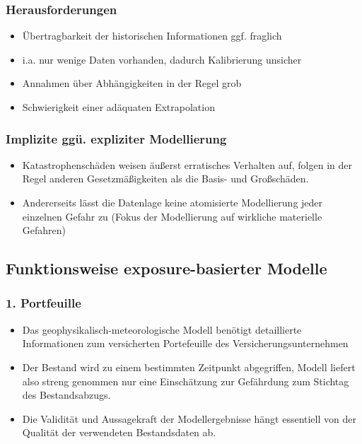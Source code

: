 \documentclass[12pt]{report}
\theoremstyle{dotless}
\theoremstyle{definition}
\begin{document}
\subsubsection{Herausforderungen} \begin{itemize}
\item Übertragbarkeit der historischen Informationen ggf. fraglich
\item i.a. nur wenige Daten vorhanden, dadurch Kalibrierung unsicher
\item Annahmen über Abhängigkeiten in der Regel grob
\item Schwierigkeit einer adäquaten Extrapolation
\end{itemize}

\subsubsection{Implizite ggü. expliziter Modellierung}
\begin{itemize}
\item Katastrophenschäden weisen äußerst erratisches Verhalten auf, folgen in der Regel anderen Gesetzmäßigkeiten als die Basis- und Großschäden.
\item Andererseits lässt die Datenlage keine atomisierte Modellierung jeder einzelnen Gefahr zu (Fokus der Modellierung auf wirkliche materielle Gefahren)
\end{itemize}

\subsection{Funktionsweise exposure-basierter Modelle}

\subsubsection{1. Portfeuille}
\begin{itemize}
\item Das geophysikalisch-meteorologische Modell benötigt detaillierte Informationen
zum versicherten Portefeuille des Versicherungsunternehmen
\item Der Bestand wird zu einem bestimmten Zeitpunkt abgegriffen, Modell liefert also
streng genommen nur eine Einschätzung zur Gefährdung zum Stichtag des
Bestandsabzugs.
\item Die Validität und Aussagekraft der Modellergebnisse hängt essentiell von der
Qualität der verwendeten Bestandsdaten ab.
\end{itemize}
\end{document}
